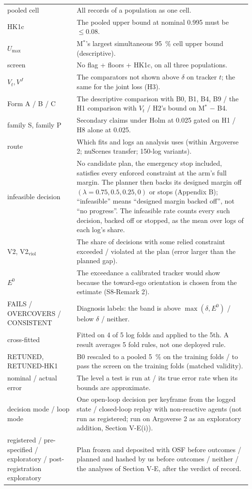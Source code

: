 \documentclass{ieeeaccess}
\begin{document}
\begin{center}
\begin{supertabular}{@{}L{0.296\columnwidth}L{0.674\columnwidth}@{}}
pooled cell & All records of a population as one cell. \\
HK1c & The pooled upper bound at nominal 0.995 must be $\leq 0.08$. \\
$U_{\max}$ & M$^{*}$'s largest simultaneous 95~\% cell upper bound (descriptive). \\
screen & No flag + floors + HK1c, on all three populations. \\
$V_{t}, V^{J}$ & The comparators not shown above $\delta$ on tracker $t$; the same for the joint loss (H3). \\
Form A / B / C & The descriptive comparison with B0, B1, B4, B9 / the H1 comparison with $V_{t}$ / H2's bound on M$^{*}$ $-$ B4. \\
family S, family P & Secondary claims under Holm at 0.025 gated on H1 / H8 alone at 0.025. \\
route & Which fits and logs an analysis uses (within Argoverse 2; nuScenes transfer; 150-log variants). \\
infeasible decision & No candidate plan, the emergency stop included, satisfies every enforced constraint at the arm's full margin. The planner then backs its designed margin off $(\lambda = 0.75, 0.5, 0.25, 0)$ or stops (Appendix B); ``infeasible'' means ``designed margin backed off'', not ``no progress''. The infeasible rate counts every such decision, backed off or stopped, as the mean over logs of each log's share. \\
V2, V2$_{\mathrm{viol}}$ & The share of decisions with some relied constraint exceeded / violated at the plan (error larger than the planned gap). \\
$E^{0}$ & The exceedance a calibrated tracker would show because the toward-ego orientation is chosen from the estimate (S8-Remark 2). \\
FAILS / OVERCOVERS / CONSISTENT & Diagnosis labels: the band is above $\max(\delta, E^{0})$ / below $\delta$ / neither. \\
cross-fitted & Fitted on 4 of 5 log folds and applied to the 5th. A result averages 5 fold rules, not one deployed rule. \\
RETUNED, RETUNED-HK1 & B0 rescaled to a pooled 5~\% on the training folds / to pass the screen on the training folds (matched validity). \\
nominal / actual error & The level a test is run at / its true error rate when its bounds are approximate. \\
decision mode / loop mode & One open-loop decision per keyframe from the logged state / closed-loop replay with non-reactive agents (not run as registered; run on Argoverse 2 as an exploratory addition, Section V-E(i)). \\
registered / pre-specified / exploratory / post-registration exploratory & Plan frozen and deposited with OSF before outcomes / planned and hashed by us before outcomes / neither / the analyses of Section V-E, after the verdict of record. \\
\end{supertabular}
\end{center}
\end{document}
